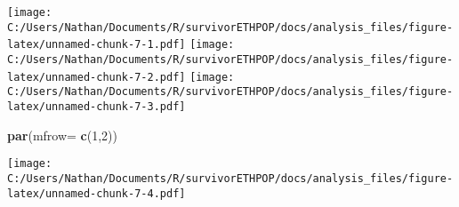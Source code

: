 \documentclass[
]{article}
\newenvironment{Shaded}{\begin{snugshade}}{\end{snugshade}}
\newcommand{\ControlFlowTok}[1]{\textcolor[rgb]{0.13,0.29,0.53}{\textbf{#1}}}
\newcommand{\DataTypeTok}[1]{\textcolor[rgb]{0.13,0.29,0.53}{#1}}
\newcommand{\DecValTok}[1]{\textcolor[rgb]{0.00,0.00,0.81}{#1}}
\newcommand{\KeywordTok}[1]{\textcolor[rgb]{0.13,0.29,0.53}{\textbf{#1}}}
\newcommand{\NormalTok}[1]{#1}
\newcommand{\OperatorTok}[1]{\textcolor[rgb]{0.81,0.36,0.00}{\textbf{#1}}}
\newcommand{\StringTok}[1]{\textcolor[rgb]{0.31,0.60,0.02}{#1}}
\begin{document}
\texttt{[image: C:/Users/Nathan/Documents/R/survivorETHPOP/docs/analysis\_files/figure-latex/unnamed-chunk-7-1.pdf]}
\texttt{[image: C:/Users/Nathan/Documents/R/survivorETHPOP/docs/analysis\_files/figure-latex/unnamed-chunk-7-2.pdf]}
\texttt{[image: C:/Users/Nathan/Documents/R/survivorETHPOP/docs/analysis\_files/figure-latex/unnamed-chunk-7-3.pdf]}

\begin{Shaded}
\begin{Highlighting}[]
\KeywordTok{par}\NormalTok{(}\DataTypeTok{mfrow=} \KeywordTok{c}\NormalTok{(}\DecValTok{1}\NormalTok{,}\DecValTok{2}\NormalTok{))}
\end{Highlighting}
\end{Shaded}

\texttt{[image: C:/Users/Nathan/Documents/R/survivorETHPOP/docs/analysis\_files/figure-latex/unnamed-chunk-7-4.pdf]}

\begin{Shaded}
\end{Shaded}
\end{document}
